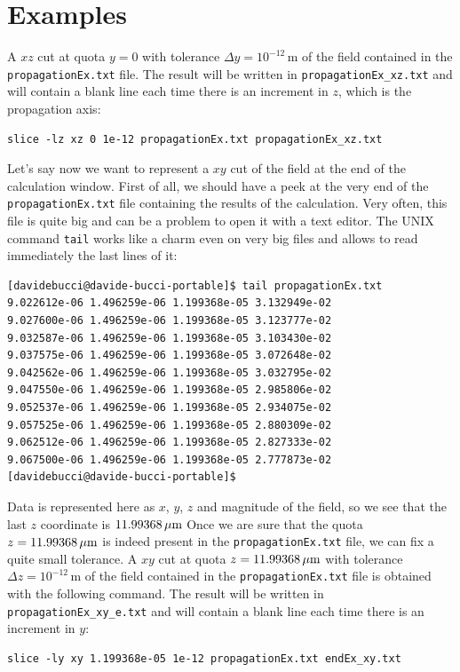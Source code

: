 \section{Examples}
A $xz$ cut at quota $y=0$ with tolerance $\Delta y=10^{-12}\,\mathrm{m}$ of the field contained in the \lstinline!propagationEx.txt! file. The result will be written in \lstinline!propagationEx_xz.txt! and will contain a blank line each time there is an increment in $z$, which is the propagation axis:
\begin{lstlisting}
slice -lz xz 0 1e-12 propagationEx.txt propagationEx_xz.txt
\end{lstlisting}


Let's say now we want to represent a $xy$ cut of the field at the end of the calculation window. First of all, we should have a peek at the very end of the \lstinline!propagationEx.txt! file containing the results of the calculation. Very often, this file is quite big and can be a problem to open it with a text editor. The UNIX command  \lstinline!tail! works like a charm even on very big files and allows to read immediately the last lines of it:
\begin{lstlisting}
[davidebucci@davide-bucci-portable]$ tail propagationEx.txt
9.022612e-06 1.496259e-06 1.199368e-05 3.132949e-02
9.027600e-06 1.496259e-06 1.199368e-05 3.123777e-02
9.032587e-06 1.496259e-06 1.199368e-05 3.103430e-02
9.037575e-06 1.496259e-06 1.199368e-05 3.072648e-02
9.042562e-06 1.496259e-06 1.199368e-05 3.032795e-02
9.047550e-06 1.496259e-06 1.199368e-05 2.985806e-02
9.052537e-06 1.496259e-06 1.199368e-05 2.934075e-02
9.057525e-06 1.496259e-06 1.199368e-05 2.880309e-02
9.062512e-06 1.496259e-06 1.199368e-05 2.827333e-02
9.067500e-06 1.496259e-06 1.199368e-05 2.777873e-02
[davidebucci@davide-bucci-portable]$
\end{lstlisting}
Data is represented here as $x$, $y$, $z$ and magnitude of the field, so we see that the last $z$ coordinate is $11.99368\,\mathrm{\mu m}$
Once we are sure that the quota $z=11.99368\,\mathrm{\mu m}$ is indeed present in the 
\lstinline!propagationEx.txt! file, we can fix a quite small tolerance.
A $xy$ cut at quota $z=11.99368\,\mathrm{\mu m}$ with tolerance $\Delta z=10^{-12}\,\mathrm{m}$ of the field contained in the \lstinline!propagationEx.txt! file is obtained with the following command. The result will be written in \lstinline!propagationEx_xy_e.txt! and will contain a blank line each time there is an increment in $y$:
\begin{lstlisting}
slice -ly xy 1.199368e-05 1e-12 propagationEx.txt endEx_xy.txt
\end{lstlisting} 

